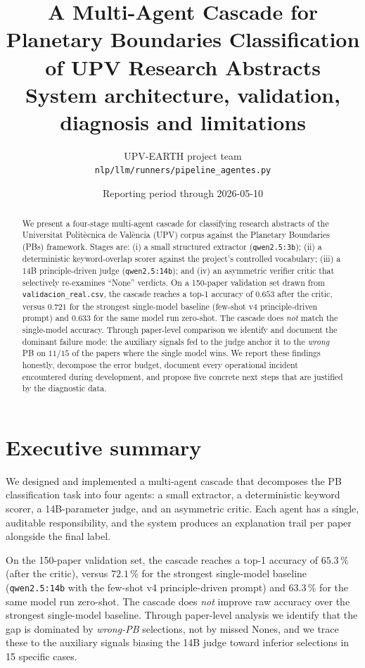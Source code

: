 \documentclass[11pt,a4paper]{article}
\title{\textbf{A Multi-Agent Cascade for Planetary Boundaries Classification\\of UPV Research Abstracts}\\[6pt]
\large System architecture, validation, diagnosis and limitations}
\author{UPV-EARTH project team\\\small \texttt{nlp/llm/runners/pipeline\_agentes.py}}
\date{Reporting period through 2026-05-10}
\begin{document}
\maketitle

\begin{abstract}
\noindent We present a four-stage multi-agent cascade for classifying research abstracts of the Universitat Polit\`ecnica de Val\`encia (UPV) corpus against the Planetary Boundaries (PBs) framework. Stages are: (i) a small structured extractor (\texttt{qwen2.5:3b}); (ii) a deterministic keyword-overlap scorer against the project's controlled vocabulary; (iii) a 14B principle-driven judge (\texttt{qwen2.5:14b}); and (iv) an asymmetric verifier critic that selectively re-examines ``None'' verdicts.
On a 150-paper validation set drawn from \texttt{validacion\_real.csv}, the cascade reaches a top-1 accuracy of $0.653$ after the critic, versus $0.721$ for the strongest single-model baseline (few-shot v4 principle-driven prompt) and $0.633$ for the same model run zero-shot. The cascade does \emph{not} match the single-model accuracy. Through paper-level comparison we identify and document the dominant failure mode: the auxiliary signals fed to the judge anchor it to the \emph{wrong} PB on $11/15$ of the papers where the single model wins. We report these findings honestly, decompose the error budget, document every operational incident encountered during development, and propose five concrete next steps that are justified by the diagnostic data.
\end{abstract}

\tableofcontents
\bigskip

\section{Executive summary}

We designed and implemented a multi-agent cascade that decomposes the PB classification task into four agents: a small extractor, a deterministic keyword scorer, a 14B-parameter judge, and an asymmetric critic. Each agent has a single, auditable responsibility, and the system produces an explanation trail per paper alongside the final label.

On the 150-paper validation set, the cascade reaches a top-1 accuracy of $\mathbf{65.3\,\%}$ (after the critic), versus $\mathbf{72.1\,\%}$ for the strongest single-model baseline (\texttt{qwen2.5:14b} with the few-shot v4 principle-driven prompt) and $63.3\,\%$ for the same model run zero-shot. The cascade does \emph{not} improve raw accuracy over the strongest single-model baseline. Through paper-level analysis we identify that the gap is dominated by \emph{wrong-PB} selections, not by missed Nones, and we trace these to the auxiliary signals biasing the 14B judge toward inferior selections in 15 specific cases.
\end{document}
